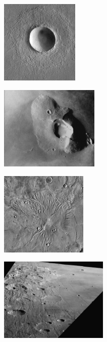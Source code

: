 \begin{figure}[h]
	\centering
	\begin{subfigure}[t]{0.3\textwidth}
		\centering
		\includegraphics[height=4cm,keepaspectratio]{images/Gre13/Gre13_01.jpg}
		\captionsetup{format=plain}
		\label{fig:ex_crater}
	\end{subfigure}
	\hfill
	\begin{subfigure}[t]{0.34\textwidth}
		\centering
		\includegraphics[height=4cm,keepaspectratio]{images/Gre13/Gre13_02.jpg}
		\captionsetup{format=plain}
		\label{fig:ex_vulc1}
	\end{subfigure}
	\hfill
	\begin{subfigure}[t]{0.3\textwidth}
		\centering
		\includegraphics[height=4cm,keepaspectratio]{images/Gre13/Gre13_03.jpg}
		\captionsetup{format=plain}
		\label{fig:ex_vulc2}
	\end{subfigure}
	\hfill
	\begin{subfigure}[t]{0.35\textwidth}
		\centering
		\includegraphics[height=4cm,keepaspectratio]{images/Gre13/Gre13_04.jpg}

\end{subfigure}
\end{figure}
